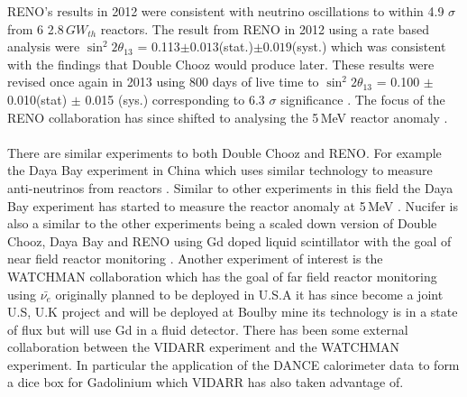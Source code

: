 RENO's results in 2012 were consistent with neutrino oscillations to within 4.9 $\sigma$ from 6 2.8\,$GW_{th}$ reactors. The result from RENO in 2012 using a rate based analysis were $\sin^2{2\theta_{13}}$ = 0.113$\pm0.013$(stat.)$\pm0.019$(syst.) which was consistent with the findings that Double Chooz would produce later. These results were revised once again in 2013 using 800 days of live time to $\sin^2{2\theta_{13}}$ = 0.100 $\pm$ 0.010(stat) $\pm$ 0.015 (sys.) corresponding to 6.3 $\sigma$ significance \cite{reno2013}. The focus of the RENO collaboration has since shifted to analysing the 5\,MeV reactor anomaly \cite{reno_may_2019}.  
\\\\There are similar experiments to both Double Chooz and RENO. For example the Daya Bay experiment in China which uses similar technology to measure anti-neutrinos from reactors \cite{DayaBay2007Precision}. Similar to other experiments in this field the Daya Bay experiment has started to measure the reactor anomaly at 5\,MeV \cite{Daya_Bay_2017}. Nucifer is also a similar to the other experiments being a scaled down version of Double Chooz, Daya Bay and RENO using Gd doped liquid scintillator with the goal of near field reactor monitoring \cite{nucifer2016}. Another experiment of interest is the WATCHMAN collaboration which has the goal of far field reactor monitoring using $\bar{\nu_e}$ originally planned to be deployed in U.S.A \cite{askins2015physics} it has since become a joint U.S, U.K project and will be deployed at Boulby mine \cite{burns2018remote} its technology is in a state of flux but will use Gd in a fluid detector. There has been some external collaboration between the VIDARR experiment and the WATCHMAN experiment. In particular the application of the DANCE calorimeter data to form a dice box for Gadolinium which VIDARR has also taken advantage of. %
